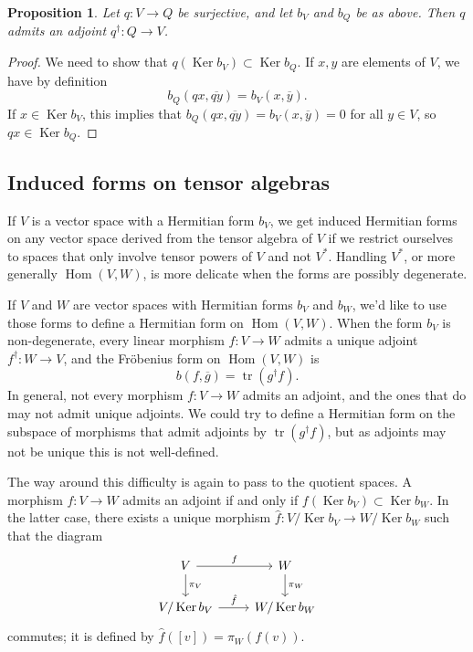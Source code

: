 \documentclass[10pt,a4paper]{amsart}
\newtheorem{prop}[theo]{Proposition}
\theoremstyle{definition}
\def\ov#1{\overline{#1}}
\DeclareMathOperator{\Ker}{Ker}
\DeclareMathOperator{\Hom}{Hom}
\DeclareMathOperator{\tr}{tr}
\begin{document}
\begin{prop}
Let $q : V \to Q$ be surjective, and let $b_V$ and $b_Q$ be as above. Then $q$ admits an adjoint $q^\dagger : Q \to V$.
\end{prop}

\begin{proof}
We need to show that $q(\Ker b_V) \subset \Ker b_Q$. If $x, y$ are elements of $V$, we have by definition
\[
b_Q(qx, \ov{qy}) = b_V(x, \ov y).
\]
If $x \in \Ker b_V$, this implies that $b_Q(qx, \ov{qy}) = b_V(x, \ov y) = 0$ for all $y \in V$, so $qx \in \Ker b_Q$.
\end{proof}





\subsection*{Induced forms on tensor algebras}
\label{sec:induced-forms-tensor}


If $V$ is a vector space with a Hermitian form $b_V$, we get induced Hermitian forms on any vector space derived from the tensor algebra of $V$ if we restrict ourselves to spaces that only involve tensor powers of $V$ and not $V^*$. Handling $V^*$, or more generally $\Hom(V,W)$, is more delicate when the forms are possibly degenerate.



If $V$ and $W$ are vector spaces with Hermitian forms $b_V$ and $b_W$, we'd like to use those forms to define a Hermitian form on $\Hom(V,W)$. When the form $b_V$ is non-degenerate, every linear morphism $f : V \to W$ admits a unique adjoint $f^\dagger : W \to V$, and the Fr\"obenius form on $\Hom(V,W)$ is
\[
b(f, \ov g) = \tr(g^\dagger f).
\]
In general, not every morphism $f : V \to W$ admits an adjoint, and the ones that do may not admit unique adjoints. We could try to define a Hermitian form on the subspace of morphisms that admit adjoints by $\tr(g^\dagger f)$, but as adjoints may not be unique this is not well-defined.

The way around this difficulty is again to pass to the quotient spaces. A morphism $f : V \to W$ admits an adjoint if and only if $f(\Ker b_V) \subset \Ker b_W$. In the latter case, there exists a unique morphism $\hat f : V / \Ker b_V \to W / \Ker b_W$ such that the diagram
\[
\begin{tikzcd}
V \ar[d,"\pi_V"] \ar[r,"f"] & W \ar[d,"\pi_W"]
\\
V / \Ker b_V \ar[r,"\hat f"] & W / \Ker b_W
\end{tikzcd}
\]
commutes; it is defined by $\hat f([v]) = \pi_W(f(v))$.
\end{document}
